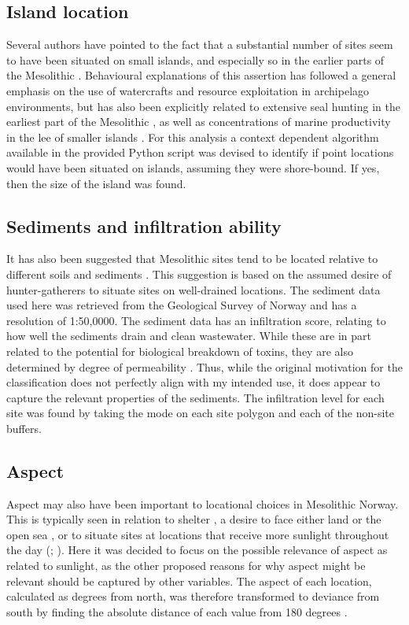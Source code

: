 \documentclass[12pt, a4paper]{article}
\begin{document}
\subsection{Island location}
Several authors have pointed to the fact that a substantial number of sites seem to have been situated on small islands, and especially so in the earlier parts of the Mesolithic \citep[e.g.][]{nyland2012, bjerck2013, bjerck2017}. Behavioural explanations of this assertion has followed a general emphasis on the use of watercrafts and resource exploitation in archipelago environments, but has also been explicitly related to extensive seal hunting in the earliest part of the Mesolithic \citep{bjerck2017}, as well as concentrations of marine productivity in the lee of smaller islands \citep{breivik2014,schmitt2015}. For this analysis a context dependent algorithm available in the provided Python script was devised to identify if point locations would have been situated on islands, assuming they were shore-bound. If yes, then the size of the island was found.

\subsection{Sediments and infiltration ability}
It has also been suggested that Mesolithic sites tend to be located relative to different soils and sediments \citep[see][]{bergsvik1995, berghansen2009}. This suggestion is based on the assumed desire of hunter-gatherers to situate sites on well-drained locations. The sediment data used here was retrieved from the Geological Survey of Norway and has a resolution of 1:50,0000. The sediment data has an infiltration score, relating to how well the sediments drain and clean wastewater. While these are in part related to the potential for biological breakdown of toxins, they are also determined by degree of permeability \citep{ngu2015}. Thus, while the original motivation for the classification does not perfectly align with my intended use, it does appear to capture the relevant properties of the sediments. The infiltration level for each site was found by taking the mode on each site polygon and each of the non-site buffers. 

\subsection{Aspect}
Aspect may also have been important to locational choices in Mesolithic Norway. This is typically seen in relation to shelter \citep[][47]{berghansen2009}, a desire to face either land or the open sea \citep{darmark2018}, or to situate sites at locations that receive more sunlight throughout the day (\citealp[][58]{mikkelsen1989}; \citealp[][113]{berghansen2009}). Here it was decided to focus on the possible relevance of aspect as related to sunlight, as the other proposed reasons for why aspect might be relevant should be captured by other variables. The aspect of each location, calculated as degrees from north, was therefore transformed to deviance from south by finding the absolute distance of each value from 180 degrees \citep[][]{spencer2018}. 
\end{document}
